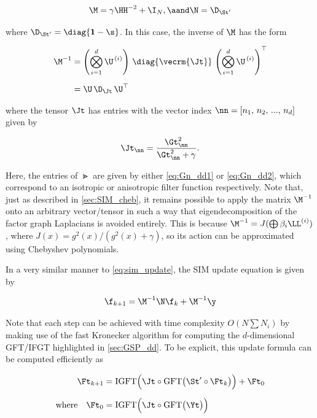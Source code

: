 \begin{equation}
    \M = \gamma \HH^{-2} + \I_N, \aand \N = \D_{\St'}
\end{equation}

where $\D_{\St'} = \diag{\mathbf{1} - \s}$. In this case, the inverse of $\M$ has the form 


\begin{align}
\M^{-1} &= \left( \bigotimes_{i=1}^d  \U^{\,(i)} \right) \, \diag{\vecrm{\Jt}}\, \left(\bigotimes_{i=1}^d  \U^{\,(i)} \right)^\top \notag \\[0.2cm]
&= \U \, \D_\Jt \, \U^\top
\end{align}

where the tensor $\Jt$ has entries with the vector index $\nn = [n_1,\, n_2,\, ...,\, n_d]$ given by 

\begin{equation}
    \Jt_{\nn} = \frac{\Gt_{\nn}^2}{\Gt_{\nn}^2 + \gamma}.
\end{equation}

Here, the entries of $\Gt$ are given by either \cref{eq:Gn_dd1} or \cref{eq:Gn_dd2}, which correspond to an isotropic or anisotropic filter function respectively. Note that, just as described in \cref{sec:SIM_cheb}, it remains possible to apply the matrix $\M^{-1}$ onto an arbitrary vector/tensor in such a way that eigendecomposition of the factor graph Laplacians is avoided entirely. This is because $\M^{-1} = J(\bigoplus \beta_i \LL^{(i)})$, where $J(x) = g^2(x) / (g^2(x) + \gamma)$, so its action can be approximated using Chebyshev polynomials. 

In a very similar manner to \cref{eq:sim_update}, the SIM update equation is given by 

\begin{equation}
    \label{eq:sim_update_dd}
    \f_{k+1} = \M^{-1}\N \f_{k} + \M^{-1} \y
\end{equation}

Note that each step can be achieved with time complexity $O(N \sum N_i)$ by making use of the fast Kronecker algorithm for computing the $d$-dimensional GFT/IFGT highlighted in \cref{sec:GSP_dd}. To be explicit, this update formula can be computed efficiently as 

\begin{align*}
    \Ft_{k+1} &= \text{IGFT} \Big( \Jt \circ \text{GFT}\big(\St' \circ \Ft_{k}\big)\Big)  + \Ft_{0} \\[0.2cm]
    \text{where} \quad \Ft_{0} &= \text{IGFT} \Big( \Jt \circ \text{GFT}\big(\Yt \big)\Big) 
\end{align*}

